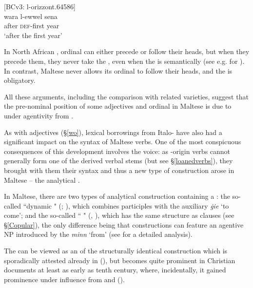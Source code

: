 \documentclass[output=paper]{langsci/langscibook}
\begin{document}
\ea\label{wo2}
	{[BCv3: l-orizzont.64586]}\\
	\gll wara l-ewwel sena\\
	after \textsc{def}-first year\\
	\glt `after the first year'\\
\z

In North African , ordinal  can either precede or follow their heads, but when they precede them, they never take the  , even when the  is semantically  (see e.g. \citealt[284]{Ritt-Benmimoun2014} for  ). In contrast, Maltese never allows its ordinal  to follow their heads, and the   is obligatory.

All these arguments, including the comparison with related  varieties, suggest that the pre-nominal position of some adjectives and ordinal  in Maltese is due to  under  agentivity from .

\largerpage %
As with adjectives (§\ref{wo}), lexical borrowings from Italo- have also had a significant impact on the syntax of Maltese verbs. One of the most conspicuous consequences of this development involves the  voice: as -origin verbs cannot generally form one of the  derived verbal stems (but see §\ref{loanedverbs}), they brought with them their  syntax and thus a new type of  construction arose in Maltese -- the analytical .

In Maltese, there are two types of analytical  construction containing a  : the so-called ``dynamic " (\citealt[321--324]{Vanhove1993}; \citealt[214]{BorgAzzopardi-Alexander1997}), which combines  participles with the  auxiliary \textit{ġie} `to come'; and the so-called `` " (\citealt[214]{BorgAzzopardi-Alexander1997}, \citealt[318--320]{Vanhove1993}), which has the same structure as  clauses (see §\ref{Copular}), the only difference being that   constructions can feature an agentive NP introduced by the  \textit{minn} `from' (see \citealt[104--107]{bulbul2018} for a detailed analysis).

The   can be viewed as an  of the structurally identical construction which is sporadically attested already in   (\citealt[76--84]{Ullmann1989}), but becomes quite prominent in Christian  documents at least as early as tenth century, where, incidentally, it gained prominence under influence from  and  (\citealt[424]{Blau1967}).
\end{document}
